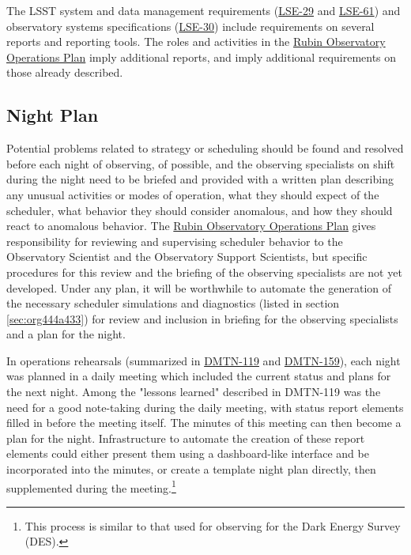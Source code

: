 The LSST system and data management requirements (\href{https://ls.st/lse-29}{LSE-29} and \href{https://ls.st/lse-61}{LSE-61}) and observatory systems specifications (\href{https://ls.st/lse-30}{LSE-30}) include requirements on several reports and reporting tools. The roles and activities in the \href{https://docushare.lsst.org/docushare/dsweb/Get/Document-36797/Rubin\%20Observatory\%20Operations\%20Plan\%20April\%202020.pdf}{Rubin Observatory Operations Plan} imply additional reports, and imply additional requirements on those already described.

\subsection{Night Plan}
\label{sec:orgd5471e6}

Potential problems related to strategy or scheduling should be found and resolved before each night of observing, of possible, and the observing specialists on shift during the night need to be briefed and provided with a written plan describing any unusual activities or modes of operation, what they should expect of the scheduler, what behavior they should consider anomalous, and how they should react to anomalous behavior.
The \href{https://docushare.lsst.org/docushare/dsweb/Get/Document-36797/Rubin\%20Observatory\%20Operations\%20Plan\%20April\%202020.pdf}{Rubin Observatory Operations Plan} gives responsibility for reviewing and supervising scheduler behavior to the Observatory Scientist and the Observatory Support Scientists, but specific procedures for this review and the briefing of the observing specialists are not yet developed.
Under any plan, it will be worthwhile to automate the generation of the necessary scheduler simulations and diagnostics (listed in section \ref{sec:org444a433}) for review and inclusion in briefing for the observing specialists and a plan for the night.

In operations rehearsals (summarized in \href{https://dmtn-119.lsst.io}{DMTN-119} and \href{https://dmtn-159.lsst.io/}{DMTN-159}), each night was planned in a daily meeting which included the current status and plans for the next night.
Among the "lessons learned" described in DMTN-119 was the need for a good note-taking during the daily meeting, with status report elements filled in before the meeting itself. 
The minutes of this meeting can then become a plan for the night.
Infrastructure to automate the creation of these report elements could either present them using a dashboard-like interface and be incorporated into the minutes, or create a template night plan directly, then supplemented during the meeting.\footnote{This process is similar to that used for observing for the Dark Energy Survey (DES).}

